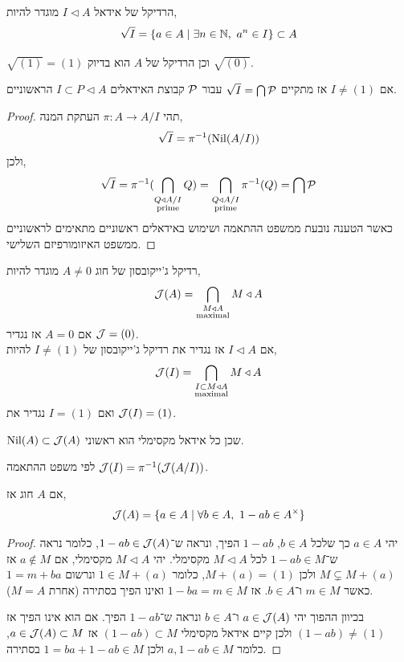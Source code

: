 \begin{definition}
	הרדיקל של אידאל $I \triangleleft A$ מוגדר להיות,
	\[
		\sqrt{I}
		= \{ a \in A \mid \exists n \in \mathbb{N},\ a^n \in I \}
		\subset A
	\]
\end{definition}
\begin{remark}
	$\sqrt{(1)} = (1)$ וכן הרדיקל של $A$ הוא בדיוק $\sqrt{(0)}$.
\end{remark}
\begin{proposition}
	אם $I \ne (1)$ אז מתקיים $\sqrt{I} = \bigcap \mathcal{P}$ עבור $\mathcal{P}$ קבוצת האידאלים $I \subset P \triangleleft A$ הראשוניים.
\end{proposition}
\begin{proof}
	תהי $\pi : A \to A / I$ העתקת המנה,
	\[
		\sqrt{I}
		= \pi^{-1}(\operatorname{Nil}(A / I))
	\]
	ולכן,
	\[
		\sqrt{I}
		= \pi^{-1}(\bigcap_{\substack{Q \triangleleft A / I \\ \text{prime}}} Q)
		= \bigcap_{\substack{Q \triangleleft A / I \\ \text{prime}}} \pi^{-1}(Q)
		= \bigcap \mathcal{P}
	\]
	כאשר הטענה נובעת ממשפט ההתאמה ושימוש באידאלים ראשוניים מתאימים לראשוניים ממשפט האיזומורפיזם השלישי.
\end{proof}
\begin{definition}
	רדיקל ג'ייקובסון של חוג $A \ne 0$ מוגדר להיות,
	\[
		\mathcal{J}(A)
		= \bigcap_{\substack{M \triangleleft A \\ \text{maximal}}} M
		\triangleleft A
	\]
	אם $A = 0$ אז נגדיר $\mathcal{J} = (0)$. \\
	אם $I \triangleleft A$ אז נגדיר את רדיקל ג'ייקובסון של $I \ne (1)$ להיות,
	\[
		\mathcal{J}(I)
		= \bigcap_{\substack{I \subset M \triangleleft A \\ \text{maximal}}} M
		\triangleleft A
	\]
	ואם $I = (1)$ נגדיר את $\mathcal{J}(I) = (1)$.
\end{definition}
\begin{remark}
	$\operatorname{Nil}(A) \subset \mathcal{J}(A)$ שכן כל אידאל מקסימלי הוא ראשוני.
\end{remark}
לפי משפט ההתאמה $\mathcal{J}(I) = \pi^{-1}(\mathcal{J}(A / I))$.
\begin{proposition}
	אם $A$ חוג אז,
	\[
		\mathcal{J}(A)
		= \{ a \in A \mid \forall b \in A,\ 1 - a b \in A^\times \}
	\]
\end{proposition}
\begin{proof}
	יהי $a \in A$ כך שלכל $b \in A$, $1 - a b$ הפיך, ונראה ש־$1 - a b \in \mathcal{J}(A)$, כלומר נראה ש־$1 - a b \in M$ לכל $M \triangleleft A$ מקסימלי.
	יהי $M \triangleleft A$ מקסימלי, אם $a \notin M$ אז $M \subsetneq M + (a)$ ולכן $M + (a) = (1)$, כלומר $1 \in M + (a)$ ונרשום $1 = m + b a$ כאשר $m \in M$ ו־$b \in A$.
	אז $1 - b a = m \in M$ ואינו הפיך בסתירה (אחרת $M = A$).

	בכיוון ההפוך יהי $a \in \mathcal{J}(A)$ ו־$b \in A$ ונראה ש־$1 - a b$ הפיך.
	אם הוא אינו הפיך אז $(1 - a b) \ne (1)$ ולכן קיים אידאל מקסימלי $(1 - a b) \subset M$ אז $a \in \mathcal{J}(A) \subset M$, כלומר $a, 1 - a b \in M$ ולכן $1 = b a + 1 - a b \in M$ בסתירה.
\end{proof}
